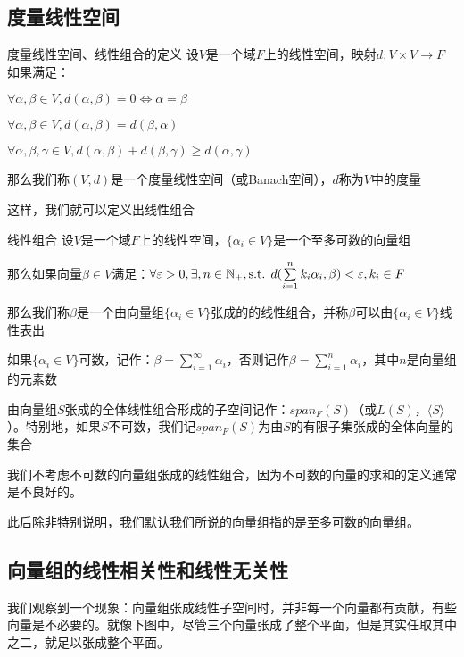 \documentclass[12pt, a4paper, oneside, UTF8]{ctexbook}
\begin{document}
		\subsection{度量线性空间}
			\begin{defn}{度量线性空间、线性组合的定义}{}
				设$V$是一个域$F$上的线性空间，映射$d:V\times V \rightarrow F$如果满足：

				 $\forall \alpha ,\beta \in V,d(\alpha ,\beta )=0 \Leftrightarrow \alpha =\beta $
			
				 $\forall \alpha ,\beta \in V,d(\alpha ,\beta )=d(\beta ,\alpha )$

				 $\forall \alpha,\beta,\gamma \in V,d(\alpha,\beta )+d(\beta ,\gamma ) \geqslant d(\alpha ,\gamma )$

				那么我们称$(V,d)$是一个度量线性空间（或Banach空间），$d$称为$V$中的度量
			\end{defn}
			这样，我们就可以定义出线性组合
			\begin{defn}{线性组合}{}
				设$V$是一个域$F$上的线性空间，$\{\alpha_i \in V\}$是一个至多可数的向量组

				那么如果向量$\beta \in V$满足：$\forall \varepsilon > 0,\exists,n \in \mathbb{N}_+,\text{s.t. }d(\sum\limits_{i=1}^{n} k_i\alpha_i,\beta ) < \varepsilon ,k_i \in F$

				那么我们称$\beta$是一个由向量组$\{\alpha_i \in V\}$张成的的线性组合，并称$\beta $可以由$\{\alpha_i \in V\}$线性表出
				
				如果$\{\alpha_i \in V\}$可数，记作：$\beta =\sum\limits_{i=1}^{\infty} \alpha_i$，否则记作$\beta =\sum\limits_{i=1}^{n} \alpha_i$，其中$n$是向量组的元素数

				由向量组$S$张成的全体线性组合形成的子空间记作：$span_F (S)$（或$L(S)$，$\langle S \rangle $）。特别地，如果$S$不可数，我们记$span_F(S)$为由$S$的有限子集张成的全体向量的集合
			\end{defn}
			我们不考虑不可数的向量组张成的线性组合，因为不可数的向量的求和的定义通常是不良好的。

			此后除非特别说明，我们默认我们所说的向量组指的是至多可数的向量组。
		\subsection{向量组的线性相关性和线性无关性}
			我们观察到一个现象：向量组张成线性子空间时，并非每一个向量都有贡献，有些向量是不必要的。就像下图中，尽管三个向量张成了整个平面，但是其实任取其中之二，就足以张成整个平面。
\end{document}
